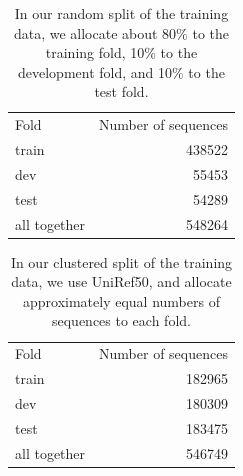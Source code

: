 \DIFaddend \begin{table}[htbp]
  \centering
  \begin{tabular}{|l|r|}
  \hline
           Fold &  Number of sequences \\
  \Xhline{2pt}
          train &               438522 \\
  \hline
            dev &               55453 \\
  \hline
           test &               54289 \\
  \hline
   all together &               548264 \\
  \hline
  \end{tabular}
  \caption{In our random split of the training data, we allocate about 80\% to the training fold, 10\% to the development fold, and 10\% to the test fold.}
  \end{table}
  \begin{table}[htbp]
  \centering
  \begin{tabular}{|l|r|}
  \hline
           Fold &  Number of sequences \\
  \Xhline{2pt}
          train &               182965 \\
  \hline
            dev &               180309 \\
  \hline
           test &               183475 \\
  \hline
   all together &               546749 \\
  \hline
  \end{tabular}
  \caption{In our clustered split of the training data, we use UniRef50, and allocate approximately equal numbers of sequences to each fold.}
  \DIFaddbeginFL 

  \DIFaddendFL \end{table}
\DIFdelbegin {}\DIFdelend \DIFaddbegin 

